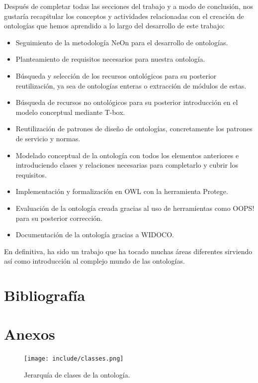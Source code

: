 \documentclass[a4paper,12pt]{article}
\begin{document}
	Después de completar todas las secciones del trabajo y a modo de conclusión, nos gustaría
	recapitular los conceptos y actividades relacionadas con el creación de ontologías que hemos
	aprendido a lo largo del desarrollo de este trabajo:
	\begin{itemize}
		\item Seguimiento de la metodología NeOn para el desarrollo de ontologías.
		\item Planteamiento de requisitos necesarios para nuestra ontología.
		\item Búsqueda y selección de los recursos ontológicos para su posterior reutilización, ya sea
de ontologías enteras o extracción de módulos de estas.
		\item Búsqueda de recursos no ontológicos para su posterior introducción en el modelo
		conceptual mediante T-box.
		\item Reutilización de patrones de diseño de ontologías, concretamente los patrones de
		servicio y normas.
		\item Modelado conceptual de la ontología con todos los elementos anteriores e
		introduciendo clases y relaciones necesarias para completarlo y cubrir los requisitos.
		\item Implementación y formalización en OWL con la herramienta Protege.
		\item Evaluación de la ontología creada gracias al uso de herramientas como OOPS! para su
		posterior corrección.
		\item Documentación de la ontología gracias a WIDOCO.
	\end{itemize}
	En definitiva, ha sido un trabajo que ha tocado muchas áreas diferentes sirviendo así como
	introducción al complejo mundo de las ontologías.
	
	
	
\newpage
	\section*{Bibliografía}
	
	
	
	\newpage
	\section*{Anexos}
	
	\begin{figure}[H]
		\centering
		\texttt{[image: include/classes.png]}
		\caption{Jerarquía de clases de la ontología.}
	\end{figure}
\end{document}

